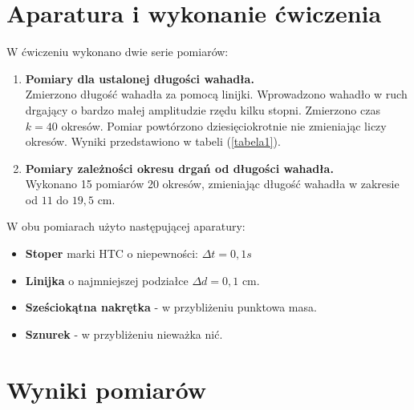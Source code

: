 \documentclass{article}
\begin{document}
\section{Aparatura i wykonanie ćwiczenia}
	W ćwiczeniu wykonano dwie serie pomiarów:
	\begin{enumerate}%
		\item \textbf{Pomiary dla ustalonej długości wahadła.}\\
			Zmierzono długość wahadła za pomocą linijki. Wprowadzono wahadło w ruch drgający o bardzo małej amplitudzie rzędu kilku stopni. Zmierzono czas $k= 40$ okresów. Pomiar powtórzono dziesięciokrotnie nie zmieniając liczy okresów. Wyniki przedstawiono w tabeli (\ref{tabela1}).
		\item \textbf{Pomiary zależności okresu drgań od długości wahadła.}\\
			Wykonano 15 pomiarów 20 okresów, zmieniając długość wahadła w zakresie od $11$ do $19,5$ cm.
	\end{enumerate}
	W obu pomiarach użyto następującej aparatury:
	\begin{itemize} %
		\item \textbf{Stoper} marki HTC o niepewności: $\Delta t = 0,1s$
		\item \textbf{Linijka} o najmniejszej podziałce $\Delta d = 0,1$ cm.
		\item \textbf{Sześciokątna nakrętka} - w przybliżeniu punktowa masa.
		\item \textbf{Sznurek} - w przybliżeniu nieważka nić. 
	\end{itemize}
	
\newpage

\section{Wyniki pomiarów}
\end{document}
